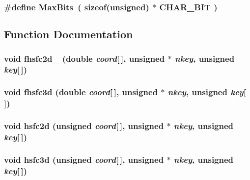\hypertarget{hilbert_8C_a0}{
\subsubsection[MaxBits]{\setlength{\rightskip}{0pt plus 5cm}\#define Max\-Bits\ ( sizeof(unsigned) $\ast$ CHAR\_\-BIT )}}
\label{hilbert_8C_a0}




\subsection{Function Documentation}
\hypertarget{hilbert_8C_a4}{
\subsubsection[fhsfc2d\_\-]{\setlength{\rightskip}{0pt plus 5cm}void fhsfc2d\_\- (double {\em coord}\mbox{[}$\,$\mbox{]}, unsigned $\ast$ {\em nkey}, unsigned {\em key}\mbox{[}$\,$\mbox{]})}}
\label{hilbert_8C_a4}


\hypertarget{hilbert_8C_a5}{
\subsubsection[fhsfc3d]{\setlength{\rightskip}{0pt plus 5cm}void fhsfc3d (double {\em coord}\mbox{[}$\,$\mbox{]}, unsigned $\ast$ {\em nkey}, unsigned {\em key}\mbox{[}$\,$\mbox{]})}}
\label{hilbert_8C_a5}


\hypertarget{hilbert_8C_a2}{
\subsubsection[hsfc2d]{\setlength{\rightskip}{0pt plus 5cm}void hsfc2d (unsigned {\em coord}\mbox{[}$\,$\mbox{]}, unsigned $\ast$ {\em nkey}, unsigned {\em key}\mbox{[}$\,$\mbox{]})}}
\label{hilbert_8C_a2}


\hypertarget{hilbert_8C_a3}{
\subsubsection[hsfc3d]{\setlength{\rightskip}{0pt plus 5cm}void hsfc3d (unsigned {\em coord}\mbox{[}$\,$\mbox{]}, unsigned $\ast$ {\em nkey}, unsigned {\em key}\mbox{[}$\,$\mbox{]})}}
\label{hilbert_8C_a3}


